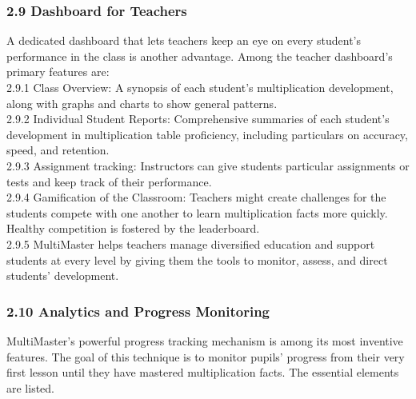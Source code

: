 \documentclass[BTech]{audiss}
\begin{document}
\subsubsection{2.9 Dashboard for Teachers}
A dedicated dashboard that lets teachers keep an eye on every student's performance in the class is another advantage. Among the teacher dashboard's primary features are:\\
2.9.1 Class Overview: A synopsis of each student's multiplication development, along with graphs and charts to show general patterns. \\
2.9.2 Individual Student Reports: Comprehensive summaries of each student's development in multiplication table proficiency, including particulars on accuracy, speed, and retention.\\
2.9.3 Assignment tracking: Instructors can give students particular assignments or tests and keep track of their performance.\\
2.9.4 Gamification of the Classroom: Teachers might create challenges for the
students compete with one another to learn multiplication facts more quickly. Healthy competition is fostered by the leaderboard.\\
2.9.5 MultiMaster helps teachers manage diversified education and support students at every level by giving them the tools to monitor, assess, and direct students' development.\\

\subsubsection{2.10 Analytics and Progress Monitoring}
MultiMaster's powerful progress tracking mechanism is among its most inventive features. The goal of this technique is to monitor pupils' progress from their very first lesson until they have mastered multiplication facts. The essential elements are listed.\\
\end{document}
